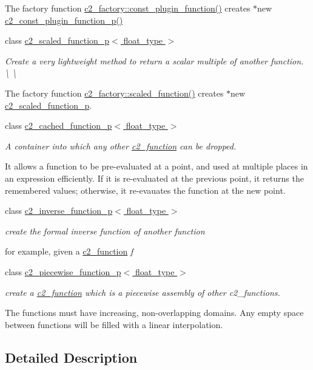 \begin{DoxyCompactItemize}
\begin{DoxyCompactList}
The factory function \hyperlink{classc2__factory_aebeb20651a347e1fa8f14118faf2588e}{c2\-\_\-factory\-::const\-\_\-plugin\-\_\-function()} creates $\ast$new \hyperlink{classc2__const__plugin__function__p_a443dc7bcbdc6e458673b98aedf53ad56}{c2\-\_\-const\-\_\-plugin\-\_\-function\-\_\-p()} \end{DoxyCompactList}\item 
class \hyperlink{classc2__scaled__function__p}{c2\-\_\-scaled\-\_\-function\-\_\-p$<$ float\-\_\-type $>$}
\begin{DoxyCompactList}\small\item\em Create a very lightweight method to return a scalar multiple of another function. \textbackslash{} \textbackslash{}

The factory function \hyperlink{classc2__factory_a81a7b686b7ffa389ad4dcd8d18997332}{c2\-\_\-factory\-::scaled\-\_\-function()} creates $\ast$new \hyperlink{classc2__scaled__function__p}{c2\-\_\-scaled\-\_\-function\-\_\-p}. \end{DoxyCompactList}\item 
class \hyperlink{classc2__cached__function__p}{c2\-\_\-cached\-\_\-function\-\_\-p$<$ float\-\_\-type $>$}
\begin{DoxyCompactList}\small\item\em A container into which any other \hyperlink{classc2__function}{c2\-\_\-function} can be dropped.

It allows a function to be pre-\/evaluated at a point, and used at multiple places in an expression efficiently. If it is re-\/evaluated at the previous point, it returns the remembered values; otherwise, it re-\/evauates the function at the new point. \end{DoxyCompactList}\item 
class \hyperlink{classc2__inverse__function__p}{c2\-\_\-inverse\-\_\-function\-\_\-p$<$ float\-\_\-type $>$}
\begin{DoxyCompactList}\small\item\em create the formal inverse function of another function

for example, given a \hyperlink{classc2__function}{c2\-\_\-function} {\itshape f} \end{DoxyCompactList}\item 
class \hyperlink{classc2__piecewise__function__p}{c2\-\_\-piecewise\-\_\-function\-\_\-p$<$ float\-\_\-type $>$}
\begin{DoxyCompactList}\small\item\em create a \hyperlink{classc2__function}{c2\-\_\-function} which is a piecewise assembly of other c2\-\_\-functions.

The functions must have increasing, non-\/overlapping domains. Any empty space between functions will be filled with a linear interpolation. \end{DoxyCompactList}\end{DoxyCompactItemize}


\subsection{Detailed Description}
